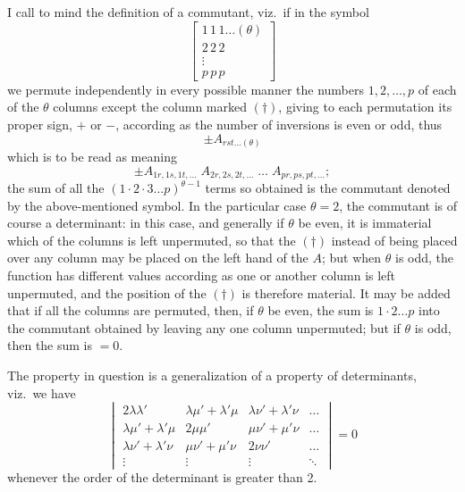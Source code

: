 \documentclass[11pt]{article}
\begin{document}
\medskip
I call to mind the definition of a commutant, viz.\ if in the symbol
\[
\left[\begin{array}{c} 1\,1\,1\dots(\theta) \\ 2\,2\,2 \\ \vdots \\ p\,p\,p \end{array}\right]
\]
we permute independently in every possible manner the numbers $1, 2, \dots, p$ of each of the $\theta$ columns except the column marked $(\dagger)$, giving to each permutation its proper sign, $+$ or $-$, according as the number of inversions is even or odd, thus
\[
\pm A_{rst\dots(\theta)}
\]
which is to be read as meaning
\[
\pm A_{1r,1s,1t,\dots} \;A_{2r,2s,2t,\dots} \;\dots\; A_{pr,ps,pt,\dots};
\]
the sum of all the $(1\cdot 2\cdot 3 \dots p)^{\theta-1}$ terms so obtained is the commutant denoted by the above-mentioned symbol. In the particular case $\theta = 2$, the commutant is of course a determinant: in this case, and generally if $\theta$ be even, it is immaterial which of the columns is left unpermuted, so that the $(\dagger)$ instead of being placed over any column may be placed on the left hand of the $A$; but when $\theta$ is odd, the function has different values according as one or another column is left unpermuted, and the position of the $(\dagger)$ is therefore material. It may be added that if all the columns are permuted, then, if $\theta$ be even, the sum is $1 \cdot 2 \dots p$ into the commutant obtained by leaving any one column unpermuted; but if $\theta$ is odd, then the sum is $=0$.

\newpage

\noindent The property in question is a generalization of a property of determinants, viz.\ we have
\[
\begin{vmatrix}
2\lambda\lambda' & \lambda\mu' + \lambda'\mu & \lambda\nu' + \lambda'\nu & \dots\\
\lambda\mu' + \lambda'\mu & 2\mu\mu' & \mu\nu' + \mu'\nu & \dots\\
\lambda\nu' + \lambda'\nu & \mu\nu' + \mu'\nu & 2\nu\nu' & \dots\\
\vdots & \vdots & \vdots & \ddots
\end{vmatrix} = 0
\]
whenever the order of the determinant is greater than 2.
\end{document}
